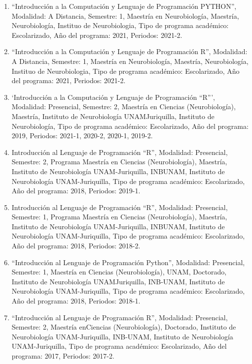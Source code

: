 \begin{enumerate}
\item “Introducción a la Computación y Lenguaje de Programación PYTHON”, Modalidad: A Distancia, Semestre: 1, 
Maestría en Neurobiología, Maestría, Neurobiología, Instituo de Neurobiologia, Tipo de programa académico: 
Escolarizado, Año del programa: 2021, Periodos: 2021-2.

\item “Introducción a la Computación y Lenguaje de Programación R”, Modalidad: A Distancia, Semestre: 1, 
Maestría en 
Neurobiología, Maestría, Neurobiología, Instituo de Neurobiologia, Tipo de programa académico: Escolarizado, 
Año del programa: 2021, Periodos: 2021-2.

\item ‘Introducción a la Computación y Lenguaje de Programación “R”’, Modalidad: Presencial, Semestre: 2, 
Maestría 
en Ciencias (Neurobiología), Maestría, Instituto de Neurobiología UNAMJuriquilla, Instituto de Neurobiología, 
Tipo de programa académico: Escolarizado, Año del programa: 2019, Periodos: 2021-1, 2020-2, 2020-1, 2019-2.

\item Introducción al Lenguaje de Programación “R”, Modalidad: Presencial, Semestre: 2, Programa Maestría en 
Ciencias (Neurobiología), Maestría, Instituto de Neurobiología UNAM-Juriquilla, INBUNAM, Instituto de 
Neurobiología UNAM-Juriquilla, Tipo de programa académico: Escolarizado, Año del programa: 2018, Periodos: 
2019-1.

\item Introducción al Lenguaje de Programación “R”, Modalidad: Presencial, Semestre: 1, Programa Maestría en 
Ciencias (Neurobiología), Maestría, Instituto de Neurobiología UNAM-Juriquilla, INBUNAM, Instituto de 
Neurobiología UNAM-Juriquilla, Tipo de programa académico: Escolarizado, Año del programa: 2018, Periodos: 
2018-2.

\item “Introducción al Lenguaje de Programación Python”, Modalidad: Presencial, Semestre: 1, Maestría en 
Ciencias 
(Neurobiología), UNAM, Doctorado, Instituto de Neurobiología UNAMJuriquilla, INB-UNAM, Instituto de 
Neurobiología UNAM-Juriquilla, Tipo de programa académico: Escolarizado, Año del programa: 2018, Periodos: 
2018-1.

\item “Introducción al Lenguaje de Programación R”, Modalidad: Presencial, Semestre: 2, Maestría enCiencias 
(Neurobiología), Doctorado, Instituto de Neurobiología UNAM-Juriquilla, INB-UNAM, Instituto de Neurobiología 
UNAM-Juriquilla, Tipo de programa académico: Escolarizado, Año del programa: 2017, Periodos: 2017-2.


\end{enumerate}
